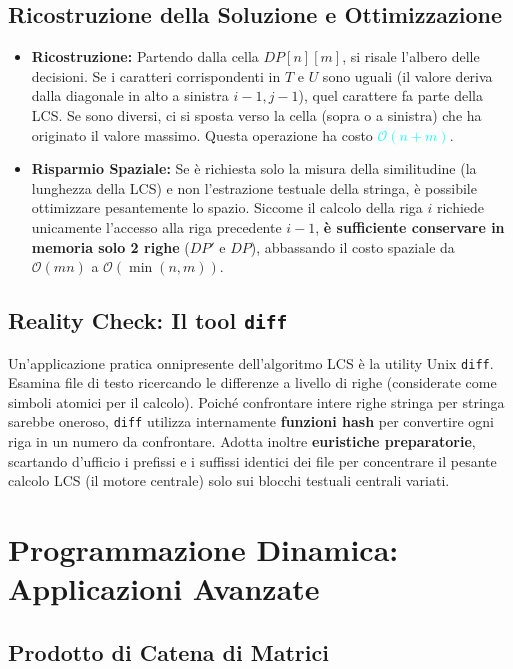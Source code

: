 \documentclass[12pt, a4paper]{article}
\begin{document}
\subsection{Ricostruzione della Soluzione e Ottimizzazione}
\begin{itemize}
\item \textbf{Ricostruzione:} Partendo dalla cella $DP[n][m]$, si risale l'albero delle decisioni. Se i caratteri corrispondenti in $T$ e $U$ sono uguali (il valore deriva dalla diagonale in alto a sinistra $i-1, j-1$), quel carattere fa parte della LCS. Se sono diversi, ci si sposta verso la cella (sopra o a sinistra) che ha originato il valore massimo. Questa operazione ha costo \textcolor{cyan}{$\mathcal{O}(n+m)$}.
\item \textbf{Risparmio Spaziale:} Se è richiesta solo la misura della similitudine (la lunghezza della LCS) e non l'estrazione testuale della stringa, è possibile ottimizzare pesantemente lo spazio. Siccome il calcolo della riga $i$ richiede unicamente l'accesso alla riga precedente $i-1$, \textbf{è sufficiente conservare in memoria solo 2 righe} ($DP'$ e $DP$), abbassando il costo spaziale da $\mathcal{O}(mn)$ a $\mathcal{O}(\min(n, m))$.
\end{itemize}

\subsection{Reality Check: Il tool \texttt{diff}}
Un'applicazione pratica onnipresente dell'algoritmo LCS è la utility Unix \texttt{diff}.
Esamina file di testo ricercando le differenze a livello di righe (considerate come simboli atomici per il calcolo).
Poiché confrontare intere righe stringa per stringa sarebbe oneroso, \texttt{diff} utilizza internamente \textbf{funzioni hash} per convertire ogni riga in un numero da confrontare. Adotta inoltre \textbf{euristiche preparatorie}, scartando d'ufficio i prefissi e i suffissi identici dei file per concentrare il pesante calcolo LCS (il motore centrale) solo sui blocchi testuali centrali variati.










\section{Programmazione Dinamica: Applicazioni Avanzate}

\subsection{Prodotto di Catena di Matrici}
\end{document}
